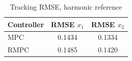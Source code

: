 \begin{table}[t]
\centering
\caption{Tracking RMSE, harmonic reference}
\label{tab:rmse_harmonic_mpc_rmpc}
\begin{tabular}{lcc}
\toprule
Controller & RMSE $x_1$ & RMSE $x_2$ \\
\midrule
MPC & 0.1434 & 0.1334 \\
RMPC & 0.1485 & 0.1420 \\
\bottomrule
\end{tabular}
\end{table}
